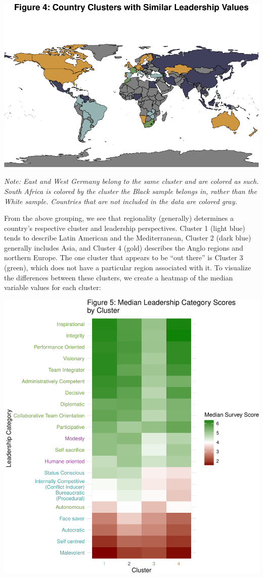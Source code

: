 \documentclass[
]{article}
\begin{document}
\begin{center}\includegraphics[width=0.85\linewidth]{globe_report_files/figure-latex/kmeans_count-1} \end{center}

\emph{Note: East and West Germany belong to the same cluster and are
colored as such. South Africa is colored by the cluster the Black sample
belongs in, rather than the White sample. Countries that are not
included in the data are colored gray.}

From the above grouping, we see that regionality (generally) determines
a country's respective cluster and leadership perspectives. Cluster 1
(light blue) tends to describe Latin American and the Mediterranean,
Cluster 2 (dark blue) generally includes Asia, and Cluster 4 (gold)
describes the Anglo regions and northern Europe. The one cluster that
appears to be ``out there'' is Cluster 3 (green), which does not have a
particular region associated with it. To visualize the differences
between these clusters, we create a heatmap of the median variable
values for each cluster:

\begin{center}\includegraphics[width=0.85\linewidth]{globe_report_files/figure-latex/cluster_values-1} \end{center}
\end{document}

